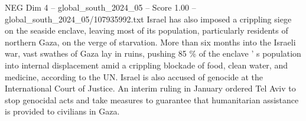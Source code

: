 \begin{textsample}{NEG Dim 4 – global\_south\_2024\_05 – Score 1.00 – global\_south\_2024\_05/107935992.txt}
Israel has also imposed a crippling siege on the seaside enclave, leaving most of its population, particularly residents of northern Gaza, on the verge of starvation.
More than six months into the Israeli war, vast swathes of Gaza lay in ruins, pushing 85 \% of the enclave ' s population into internal displacement amid a crippling blockade of food, clean water, and medicine, according to the UN.
Israel is also accused of genocide at the International Court of Justice.
An interim ruling in January ordered Tel Aviv to stop genocidal acts and take measures to guarantee that humanitarian assistance is provided to civilians in Gaza.

\end{textsample}
